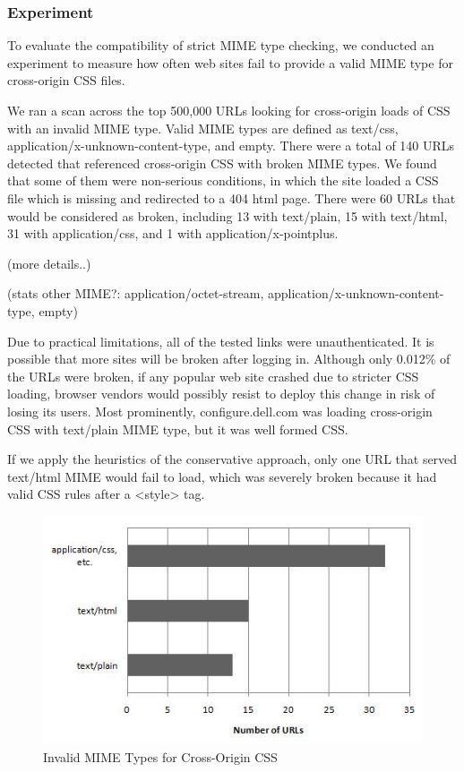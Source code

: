 \documentclass{acm_proc_article-sp}
\begin{document}
{\subsubsection{Experiment}
To evaluate the compatibility of strict MIME type checking, we conducted an experiment to measure how often web sites fail to provide a valid MIME type for cross-origin CSS files.

We ran a scan across the top 500,000 URLs looking for cross-origin loads of CSS with an invalid MIME type. Valid MIME types are defined as text/css, application/x-unknown-content-type, and empty. There were a total of 140 URLs detected that referenced cross-origin CSS with broken MIME types. We found that some of them were non-serious conditions, in which the site loaded a CSS file which is missing and redirected to a 404 html page. There were 60 URLs that would be considered as broken, including 13 with text/plain, 15 with text/html, 31 with application/css, and 1 with application/x-pointplus.

(more details..)

(stats other MIME?: application/octet-stream, application/x-unknown-content-type, empty)

Due to practical limitations, all of the tested links were unauthenticated. It is possible that more sites will be broken after logging in. Although only 0.012\% of the URLs were broken, if any popular web site crashed due to stricter CSS loading, browser vendors would possibly resist to deploy this change in risk of losing its users. Most prominently, configure.dell.com was loading cross-origin CSS with text/plain MIME type, but it was well formed CSS.

If we apply the heuristics of the conservative approach, only one URL that served text/html MIME would fail to load, which was severely broken because it had valid CSS rules after a <style> tag.

\begin{figure}
\centering
\includegraphics[width=\linewidth]{mime.jpg}
\caption{Invalid MIME Types for Cross-Origin CSS}
\end{figure}

}
\end{document}
